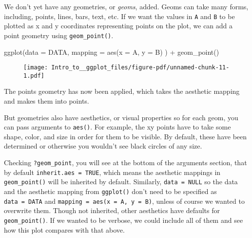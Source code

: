 \documentclass[
  letterpaper,
  DIV=11,
  numbers=noendperiod]{scrartcl}
\newenvironment{Shaded}{\begin{snugshade}}{\end{snugshade}}
\newcommand{\AttributeTok}[1]{\textcolor[rgb]{0.40,0.45,0.13}{#1}}
\newcommand{\FunctionTok}[1]{\textcolor[rgb]{0.28,0.35,0.67}{#1}}
\newcommand{\NormalTok}[1]{\textcolor[rgb]{0.00,0.23,0.31}{#1}}
\newcommand{\SpecialCharTok}[1]{\textcolor[rgb]{0.37,0.37,0.37}{#1}}
\begin{document}
We don't yet have any geometries, or \emph{geoms}, added. Geoms can take
many forms, including, points, lines, bars, text, etc. If we want the
values in \texttt{A} and \texttt{B} to be plotted as x and y coordinates
representing points on the plot, we can add a point geometry using
\texttt{geom\_point()}.

\begin{Shaded}
\begin{Highlighting}[]
\FunctionTok{ggplot}\NormalTok{(}\AttributeTok{data =}\NormalTok{ DATA, }
       \AttributeTok{mapping =} \FunctionTok{aes}\NormalTok{(}\AttributeTok{x =}\NormalTok{ A, }\AttributeTok{y =}\NormalTok{ B)}
\NormalTok{       ) }\SpecialCharTok{+}
  \FunctionTok{geom\_point}\NormalTok{()}
\end{Highlighting}
\end{Shaded}

\begin{figure}[H]

{\centering \texttt{[image: Intro\_to\_\_ggplot\_files/figure-pdf/unnamed-chunk-11-1.pdf]}

}

\end{figure}

The points geometry has now been applied, which takes the aesthetic
mapping and makes them into points.

But geometries also have aesthetics, or visual properties so for each
geom, you can pass arguments to \texttt{aes()}. For example, the xy
points have to take some shape, color, and size in order for them to be
visible. By default, these have been determined or otherwise you
wouldn't see black circles of any size.

Checking \texttt{?geom\_point}, you will see at the bottom of the
arguments section, that by default \texttt{inherit.aes\ =\ TRUE}, which
means the aesthetic mappings in \texttt{geom\_point()} will be inherited
by default. Similarly, \texttt{data\ =\ NULL} so the data and the
aesthetic mapping from \texttt{ggplot()} don't need to be specified as
\texttt{data\ =\ DATA} and \texttt{mapping\ =\ aes(x\ =\ A,\ y\ =\ B)},
unless of course we wanted to overwrite them. Though not inherited,
other aesthetics have defaults for \texttt{geom\_point()}. If we wanted
to be verbose, we could include all of them and see how this plot
compares with that above.
\end{document}
